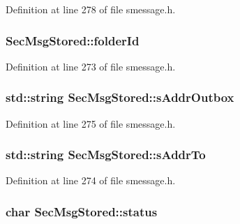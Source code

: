 Definition at line 278 of file smessage.\+h.

\hypertarget{class_sec_msg_stored_a1ec4984f1718b756aeb18b44aaf4fbad}{}
\subsubsection[{folder\+Id}]{ Sec\+Msg\+Stored\+::folder\+Id}\label{class_sec_msg_stored_a1ec4984f1718b756aeb18b44aaf4fbad}


Definition at line 273 of file smessage.\+h.

\hypertarget{class_sec_msg_stored_a9200ada27d6664d6c4c995fac0ed486d}{}
\subsubsection[{s\+Addr\+Outbox}]{\setlength{\rightskip}{0pt plus 5cm}std\+::string Sec\+Msg\+Stored\+::s\+Addr\+Outbox}\label{class_sec_msg_stored_a9200ada27d6664d6c4c995fac0ed486d}


Definition at line 275 of file smessage.\+h.

\hypertarget{class_sec_msg_stored_af1f7fa5c7ae4fb43ad914e87686425a1}{}
\subsubsection[{s\+Addr\+To}]{\setlength{\rightskip}{0pt plus 5cm}std\+::string Sec\+Msg\+Stored\+::s\+Addr\+To}\label{class_sec_msg_stored_af1f7fa5c7ae4fb43ad914e87686425a1}


Definition at line 274 of file smessage.\+h.

\hypertarget{class_sec_msg_stored_a63b5b4cfb96450a5c170981e108315fe}{}
\subsubsection[{status}]{\setlength{\rightskip}{0pt plus 5cm}char Sec\+Msg\+Stored\+::status}\label{class_sec_msg_stored_a63b5b4cfb96450a5c170981e108315fe}


